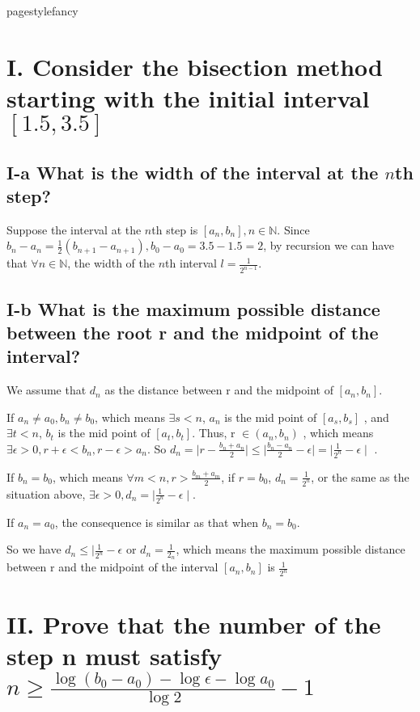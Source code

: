 \documentclass[twoside,a4paper]{article}
\begin{document}
pagestyle{fancy}
\fancyhead{}


\section*{I. \small{Consider the bisection method starting with the initial interval $[1.5,3.5]$}}

\subsection*{I-a \small{What is the width of the interval at the $n$th step?}} 

Suppose the interval at the $n$th step is $[a_{n},b_{n}],n\in\mathbb{N}$. 
Since $b_{n}-a_{n}=\frac{1}{2}(b_{n+1}-a_{n+1}), b_{0}-a_{0}=3.5-1.5=2$, 
by recursion we can have that $\forall n\in\mathbb{N}$, the width of the $n$th interval $l=\frac{1}{2^{n-1}}$.
 
\subsection*{I-b \small{What is the maximum possible distance between the root r and the midpoint of the interval?}}

We assume that $d_{n}$ as the distance between r and the midpoint of $[a_{n}, b_{n}]$.  

If  $a_{n}\neq a_{0}, b_{n}\neq b_{0}$, which means $\exists s<n$, $a_{n}$ is the mid point of $[a_{s},b_{s}]$
, and $\exists t<n$, $b_{t}$ is the mid point of $[a_{t}, b_{t}]$. Thus, r $\in \left( a_{n},b_{n} \right) $ 
, which means $\exists \epsilon>0 , r+\epsilon<b_{n},r-\epsilon>a_{n}$. So $d_{n}= \mid r-\frac{b_{n}+a_{n}}{2} \mid \le
 \mid \frac{b_{n}-a_{n}}{2}-\epsilon \mid = \mid \frac{1}{2^{n}}-\epsilon \mid $
 . 
 
 If $b_{n}=b_{0}$, which means $\forall m<n, r>\frac{b_{m}+a_{m}}{2}$, if $r=b_{0}$, $d_{n} = \frac{1}{2^{n}}$, or 
 the same as the situation above, $\exists \epsilon>0, d_{n}=  \mid \frac{1}{2^{n}}-\epsilon \mid $.
 
 If $a_{n}=a_{0}$, the consequence is similar as that when $b_{n}=b_{0}$.
 
 So we have $d_{n} \le  \mid \frac{1}{2^{n}}-\epsilon$ or $d_{n}=\frac{1}{2_n}$, which means the maximum possible distance
 between r and the midpoint of the interval $[a_{n}, b_{n}]$ is $\frac{1}{2^{n}}$ 
 \section*{II. \small{Prove that the number of the step n must satisfy $n\ge \frac{\log(b_{0}-a_{0})-\log\epsilon-\log a_0}{\log2}-1$}}
\end{document}
